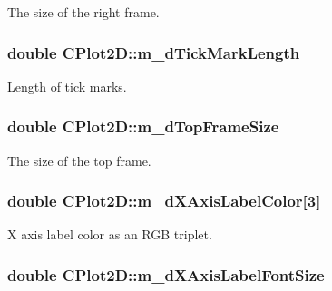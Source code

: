 The size of the right frame. \hypertarget{class_c_plot2_d_aae3dd5651d0422be83f8469ff4a848df}{
\subsubsection[{m\-\_\-d\-Tick\-Mark\-Length}]{\setlength{\rightskip}{0pt plus 5cm}double C\-Plot2\-D\-::m\-\_\-d\-Tick\-Mark\-Length\hspace{0.3cm}{\ttfamily [protected]}}}\label{class_c_plot2_d_aae3dd5651d0422be83f8469ff4a848df}
Length of tick marks. \hypertarget{class_c_plot2_d_a75bc80e91708e1aab4794a09d1845241}{
\subsubsection[{m\-\_\-d\-Top\-Frame\-Size}]{\setlength{\rightskip}{0pt plus 5cm}double C\-Plot2\-D\-::m\-\_\-d\-Top\-Frame\-Size\hspace{0.3cm}{\ttfamily [protected]}}}\label{class_c_plot2_d_a75bc80e91708e1aab4794a09d1845241}
The size of the top frame. \hypertarget{class_c_plot2_d_a8c07672b5c902ee6dc348abc50f59f68}{
\subsubsection[{m\-\_\-d\-X\-Axis\-Label\-Color}]{\setlength{\rightskip}{0pt plus 5cm}double C\-Plot2\-D\-::m\-\_\-d\-X\-Axis\-Label\-Color\mbox{[}3\mbox{]}\hspace{0.3cm}{\ttfamily [protected]}}}\label{class_c_plot2_d_a8c07672b5c902ee6dc348abc50f59f68}
X axis label color as an R\-G\-B triplet. \hypertarget{class_c_plot2_d_a7666e3f16b0ba5617549ed5d838ad60d}{
\subsubsection[{m\-\_\-d\-X\-Axis\-Label\-Font\-Size}]{\setlength{\rightskip}{0pt plus 5cm}double C\-Plot2\-D\-::m\-\_\-d\-X\-Axis\-Label\-Font\-Size\hspace{0.3cm}{\ttfamily [protected]}}}\label{class_c_plot2_d_a7666e3f16b0ba5617549ed5d838ad60d}
